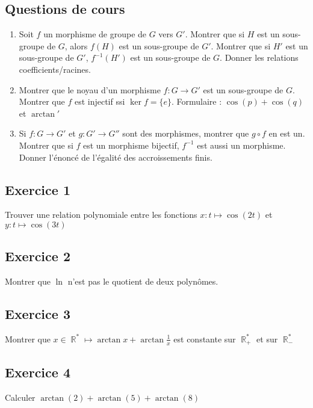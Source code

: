 \documentclass{article}
\DeclareMathOperator{\R}{\mathbb{R}}
\begin{document}
\subsection*{Questions de cours} 

\begin{enumerate}
    \item Soit $f$ un morphisme de groupe de $G$ vers $G'$. 
Montrer que si $H$ est un sous-groupe de $G$, alors $f(H)$ est un sous-groupe de $G'$. Montrer que si $H'$ est un sous-groupe de $G'$, $f^{-1}(H')$ est un sous-groupe de $G$. Donner les relations coefficients/racines.   
    \item Montrer que le noyau d'un morphisme $f : G \to G'$ est un sous-groupe de $G$. Montrer que $f$ est injectif ssi $\ker{f} = \{e\}$. Formulaire : $\cos(p) + \cos(q)$ et $\arctan'$
    \item Si $f : G \to G'$ et $g : G' \to G''$ sont des morphismes, montrer que $g\circ f$ en est un. Montrer que si $f$ est un morphisme bijectif, $f^{-1}$ est aussi un morphisme. Donner l'énoncé de l'égalité des accroissements finis. 
\end{enumerate}
   
\subsection*{Exercice 1} 

Trouver une relation polynomiale entre les fonctions $x : t \mapsto \cos(2t)$ et $y : t \mapsto \cos(3t)$ 

\subsection*{Exercice 2} 

Montrer que $\ln$ n'est pas le quotient de deux polynômes. 

\subsection*{Exercice 3} 

Montrer que $\displaystyle x\in \R^* \mapsto \arctan{x} + \arctan{\frac{1}{x}}$ est constante sur $\R_+^*$ et sur $\R_-^*$ 

\subsection*{Exercice 4} 

Calculer $\arctan(2) + \arctan(5) + \arctan(8)$ 
\end{document}
